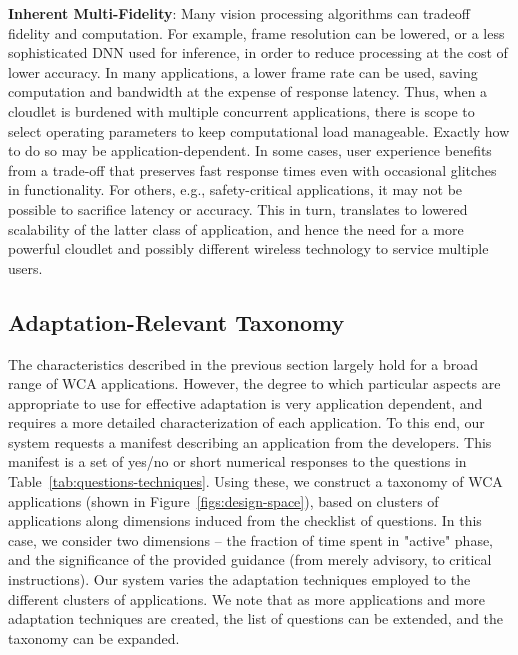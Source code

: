\textbf{Inherent Multi-Fidelity}: Many vision processing algorithms
can tradeoff fidelity and computation.  For example, frame resolution
can be lowered, or a less sophisticated DNN used for inference, in
order to reduce processing at the cost of lower accuracy.  In many
applications, a lower frame rate can be used, saving computation and
bandwidth at the expense of response latency.  Thus, when a cloudlet
is burdened with multiple concurrent applications, there is scope to
select operating parameters to keep computational load manageable.
Exactly how to do so may be application-dependent.  In some cases,
user experience benefits from a trade-off that preserves fast response
times even with occasional glitches in functionality.  For others,
e.g., safety-critical applications, it may not be possible to
sacrifice latency or accuracy.  This in turn, translates to lowered
scalability of the latter class of application, and hence the need for
a more powerful cloudlet and possibly different wireless technology to
service multiple users.

\subsection{Adaptation-Relevant Taxonomy}
\label{sec:taxonomy}

The characteristics described in the previous section largely hold for
a broad range of WCA applications.  However, the degree to which
particular aspects are appropriate to use for effective adaptation is
very application dependent, and requires a more detailed
characterization of each application.  To this end, our system
requests a manifest describing an application from the developers.
This manifest is a set of yes/no or short numerical responses to the
questions in Table~\ref{tab:questions-techniques}.  Using these, we
construct a taxonomy of WCA applications (shown in
Figure~\ref{figs:design-space}), based on clusters of applications along
dimensions induced from the checklist of questions.  In this case, we
consider two dimensions -- the fraction of time spent in "active"
phase, and the significance of the provided guidance (from merely
advisory, to critical instructions).  Our system varies the adaptation
techniques employed to the different clusters of applications.  We
note that as more applications and more adaptation techniques are
created, the list of questions can be extended, and the taxonomy can be
expanded.

